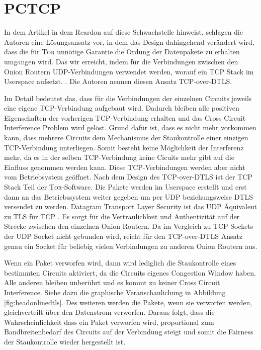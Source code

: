 \documentclass[fleqn,envcountsame,runningheads,10pt,a4paper]{llncs}
\begin{document}
\section{PCTCP}
\label{sec:pctcp}

In dem Artikel in dem Reardon auf diese Schwachstelle hinweist, schlagen die Autoren eine Lösungsansatz vor, in dem das Design dahingehend verändert wird, dass die für \textsc{Tor} unnötige Garantie die Ordung der Datenpakete zu erhalten umgangen wird. Das wir erreicht, indem für die Verbindungen zwischen den Onion Routern UDP-Verbindungen verwendet werden, worauf ein TCP Stack im Userspace aufsetzt. \cite{tcp-over-dtls}. Die Autoren nennen diesen Ansatz TCP-over-DTLS.

Im Detail bedeutet das, dass für die Verbindungen der einzelnen Circuits jeweils eine eigene TCP-Verbindung aufgebaut wird. Dadurch bleiben alle positiven Eigenschaften der vorherigen TCP-Verbindung erhalten und das Cross Circuit Interference Problem wird gelöst. Grund dafür ist, dass es nicht mehr vorkommen kann, dass mehrere Circuits dem Mechanismus der Staukontrolle einer einzigen TCP-Verbindung unterliegen. Somit besteht keine Möglichkeit der Interferenz mehr, da es in der selben TCP-Verbindung keine Cicuits mehr gibt auf die Einfluss genommen werden kann. Diese TCP-Verbindungen werden aber nicht vom Betriebsystem geöffnet. Nach dem Design des TCP-over-DTLS ist der TCP Stack Teil der \textsc{Tor}-Software. Die Pakete werden im Userspace erstellt und erst dann an das Betriebssystem weiter gegeben um per UDP beziehungsweise DTLS versendet zu werden. Datagram Transport Layer Security ist das UDP Äquivalent zu TLS für TCP \cite{dtls}. Es sorgt für die Vertraulichkeit und Authentizität auf der Strecke zwischen den einzelnen Onion Routern. Da im Vergleich zu TCP Sockets der UDP Socket nicht gebunden wird, reicht für den TCP-over-DTLS Ansatz genau ein Socket für beliebig vielen Verbindungen zu anderen Onion Routern aus.

Wenn ein Paket verworfen wird, dann wird lediglich die Staukontrolle eines bestimmten Circuits aktiviert, da die Circuits eigenes Congestion Window haben. Alle anderen bleiben unberührt und es kommt zu keiner Cross Circuit Interference. Siehe dazu die graphische Veranschaulichung in Abbildung \ref{fig:headonlinedtls}. Des weiteren werden die Pakete, wenn sie verworfen werden, gleichverteilt über den Datenstrom verworfen. Daraus folgt, dass die Wahrscheinlichkeit dass ein Paket verworfen wird, proportional zum Bandbreitenbedarf des Circuits auf der Verbindung steigt und somit die Fairness der Staukontrolle wieder hergestellt ist.
\end{document}
